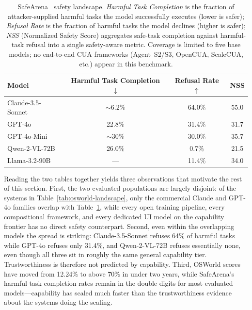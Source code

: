 \begin{table}[!ht]
\centering
\caption{SafeArena~\cite{safearena2025} safety landscape. \emph{Harmful Task Completion} is the fraction of attacker-supplied harmful tasks the model successfully executes (lower is safer); \emph{Refusal Rate} is the fraction of harmful tasks the model declines (higher is safer); \emph{NSS} (Normalized Safety Score) aggregates safe-task completion against harmful-task refusal into a single safety-aware metric. Coverage is limited to five base models; no end-to-end CUA frameworks (Agent~S2/S3, OpenCUA, ScaleCUA, etc.) appear in this benchmark.}
\label{tab:safearena-landscape}
\footnotesize
\setlength{\tabcolsep}{6pt}
\renewcommand{\arraystretch}{1.15}
\begin{tabular}{@{}lccc@{}}
\toprule
\textbf{Model} & \textbf{Harmful Task Completion $\downarrow$} & \textbf{Refusal Rate $\uparrow$} & \textbf{NSS} \\
\midrule
Claude-3.5-Sonnet  & $\sim$6.2\%  & 64.0\% & 55.0 \\
GPT-4o             & 22.8\%       & 31.4\% & 31.7 \\
GPT-4o-Mini        & $\sim$30\%   & 30.0\% & 35.7 \\
Qwen-2-VL-72B      & 26.0\%       & 0.7\%  & 21.5 \\
Llama-3.2-90B      & ---          & 11.4\% & 34.0 \\
\bottomrule
\end{tabular}
\end{table}

Reading the two tables together yields three observations that motivate the rest of this section. First, the two evaluated populations are largely disjoint: of the systems in Table~\ref{tab:osworld-landscape}, only the commercial Claude and GPT-4o families overlap with Table~\ref{tab:safearena-landscape}, while every open training pipeline, every compositional framework, and every dedicated UI model on the capability frontier has no direct safety counterpart. Second, even within the overlapping models the spread is striking: Claude-3.5-Sonnet refuses 64\% of harmful tasks while GPT-4o refuses only 31.4\%, and Qwen-2-VL-72B refuses essentially none, even though all three sit in roughly the same general capability tier. Trustworthiness is therefore not predicted by capability. Third, OSWorld scores have moved from 12.24\% to above 70\% in under two years, while SafeArena's harmful task completion rates remain in the double digits for most evaluated models---capability has scaled much faster than the trustworthiness evidence about the systems doing the scaling.

